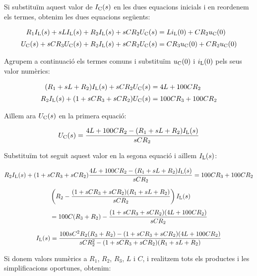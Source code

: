 \begin{exemple}
    Si substituïm aquest valor de $I_\mathrm{C}(s)$ en les dues equacions
    inicials i en reordenem els termes, obtenim les dues equacions següents:

    \begin{align*}
        R_1 I_\mathrm{L}(s) + s L I_\mathrm{L}(s)  + R_2
        I_\mathrm{L}(s) + s C R_2 U_\mathrm{C}(s) &= L i_\mathrm{L}(0) + C R_2 u_\mathrm{C}(0)\\[0.5ex]
        U_\mathrm{C}(s) + s C R_3 U_\mathrm{C}(s) + R_2 I_\mathrm{L}(s) + s C R_2 U_\mathrm{C}(s)
        &= C R_3 u_\mathrm{C}(0) + C R_2 u_\mathrm{C}(0)
    \end{align*}

    Agrupem a continuació els termes comuns i substituïm $u_\mathrm{C}(0)$ i
    $i_\mathrm{L}(0)$ pels seus valor numèrics:

    \begin{align*}
        (R_1 + s L + R_2) I_\mathrm{L}(s) + s C R_2 U_\mathrm{C}(s) &= 4 L  + 100 C R_2\\[0.5ex]
        R_2 I_\mathrm{L}(s) + (1 +s C R_3 + s C R_2) U_\mathrm{C}(s) &= 100 C R_3  + 100 C R_2
    \end{align*}

    Aïllem ara $U_\mathrm{C}(s)$ en la primera equació:

    \[
        U_\mathrm{C}(s) = \frac{4 L  + 100 C R_2 -(R_1 + s L + R_2) I_\mathrm{L}(s)}{s C R_2}
    \]

    Substituïm tot seguit aquest valor en la segona equació i aïllem
    $I_\mathrm{L}(s)$:

    \begin{gather*}
       R_2 I_\mathrm{L}(s) + (1 + s C R_3 + s C R_2) \frac{4 L  + 100 C R_2 - (R_1 + s L + R_2)I_\mathrm{L}(s)}{s C R_2} = 100 C R_3  + 100 C R_2 \\[1.5ex]
       \begin{split} &\left( R_2 - \frac{(1 +s C R_3 + s C R_2)(R_1 + s L + R_2)}{s C R_2} \right) I_\mathrm{L}(s)
        \\[1ex] &= 100 C (R_3  + R_2) - \frac{(1 +s C R_3 + s C R_2)(4 L  + 100 C R_2)}{s C
       R_2}\end{split}\\[1.5ex]
    I_\mathrm{L}(s) = \frac{100 s C^2 R_2(R_3  + R_2)- (1 +s C R_3 + s C
    R_2)(4 L  + 100 C R_2)}{s C R_2^2  -(1 +s C R_3 + s C R_2)(R_1 + s L
    + R_2)}
    \end{gather*}

    Si donem valors numèrics a $R_1$, $R_2$, $R_3$, $L$ i $C$, i
    realitzem tots els productes i les  simplificacions oportunes,
    obtenim:


\end{exemple}
